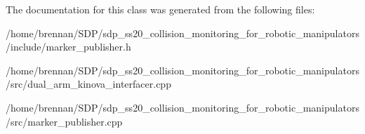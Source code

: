 The documentation for this class was generated from the following files\+:\begin{DoxyCompactItemize}
\item 
/home/brennan/\+S\+D\+P/sdp\+\_\+ss20\+\_\+collision\+\_\+monitoring\+\_\+for\+\_\+robotic\+\_\+manipulators/include/marker\+\_\+publisher.\+h\item 
/home/brennan/\+S\+D\+P/sdp\+\_\+ss20\+\_\+collision\+\_\+monitoring\+\_\+for\+\_\+robotic\+\_\+manipulators/src/dual\+\_\+arm\+\_\+kinova\+\_\+interfacer.\+cpp\item 
/home/brennan/\+S\+D\+P/sdp\+\_\+ss20\+\_\+collision\+\_\+monitoring\+\_\+for\+\_\+robotic\+\_\+manipulators/src/marker\+\_\+publisher.\+cpp\end{DoxyCompactItemize}

